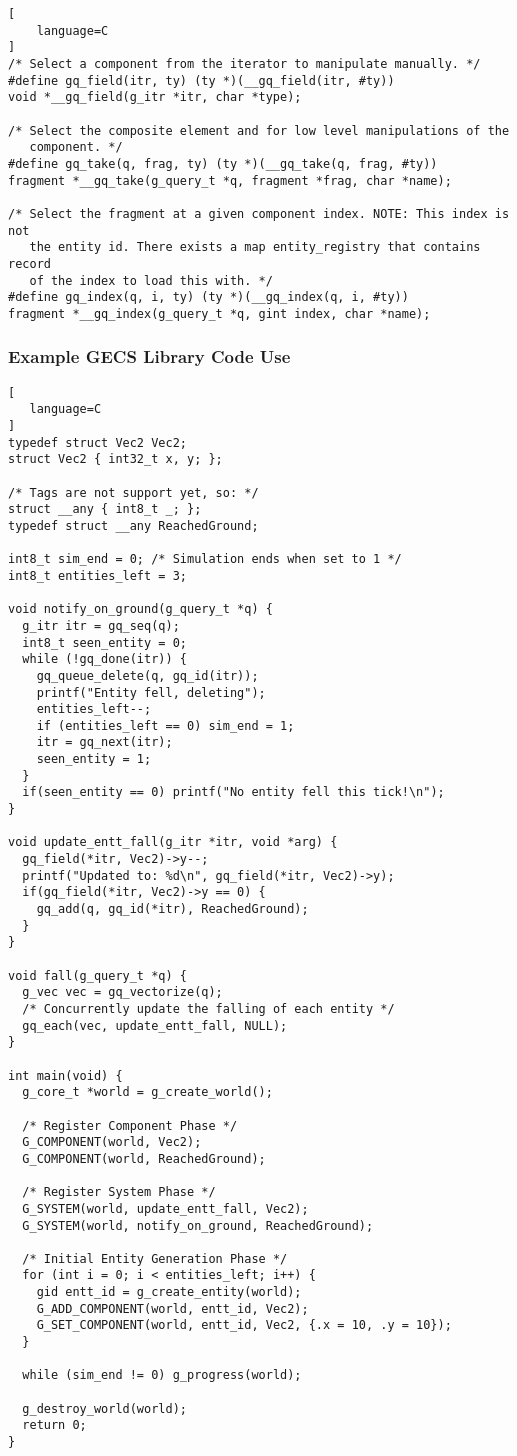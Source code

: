 \begin{lstlisting}[
    language=C
]
/* Select a component from the iterator to manipulate manually. */
#define gq_field(itr, ty) (ty *)(__gq_field(itr, #ty))
void *__gq_field(g_itr *itr, char *type);

/* Select the composite element and for low level manipulations of the
   component. */
#define gq_take(q, frag, ty) (ty *)(__gq_take(q, frag, #ty))
fragment *__gq_take(g_query_t *q, fragment *frag, char *name);

/* Select the fragment at a given component index. NOTE: This index is not
   the entity id. There exists a map entity_registry that contains record
   of the index to load this with. */
#define gq_index(q, i, ty) (ty *)(__gq_index(q, i, #ty))
fragment *__gq_index(g_query_t *q, gint index, char *name);
\end{lstlisting}

\subsubsection{Example GECS Library Code Use}
\label{appendix:code_example_1}
\begin{lstlisting}[
   language=C
]
typedef struct Vec2 Vec2;
struct Vec2 { int32_t x, y; };

/* Tags are not support yet, so: */
struct __any { int8_t _; };
typedef struct __any ReachedGround;

int8_t sim_end = 0; /* Simulation ends when set to 1 */
int8_t entities_left = 3;

void notify_on_ground(g_query_t *q) {
  g_itr itr = gq_seq(q);
  int8_t seen_entity = 0;
  while (!gq_done(itr)) {
    gq_queue_delete(q, gq_id(itr));
    printf("Entity fell, deleting");
    entities_left--;
    if (entities_left == 0) sim_end = 1;
    itr = gq_next(itr);
    seen_entity = 1;
  }
  if(seen_entity == 0) printf("No entity fell this tick!\n");
}

void update_entt_fall(g_itr *itr, void *arg) { 
  gq_field(*itr, Vec2)->y--;
  printf("Updated to: %d\n", gq_field(*itr, Vec2)->y);
  if(gq_field(*itr, Vec2)->y == 0) {
    gq_add(q, gq_id(*itr), ReachedGround);
  } 
}

void fall(g_query_t *q) {
  g_vec vec = gq_vectorize(q);
  /* Concurrently update the falling of each entity */
  gq_each(vec, update_entt_fall, NULL);
}

int main(void) {
  g_core_t *world = g_create_world();

  /* Register Component Phase */
  G_COMPONENT(world, Vec2);
  G_COMPONENT(world, ReachedGround);

  /* Register System Phase */
  G_SYSTEM(world, update_entt_fall, Vec2);
  G_SYSTEM(world, notify_on_ground, ReachedGround);

  /* Initial Entity Generation Phase */
  for (int i = 0; i < entities_left; i++) {
    gid entt_id = g_create_entity(world);
    G_ADD_COMPONENT(world, entt_id, Vec2);
    G_SET_COMPONENT(world, entt_id, Vec2, {.x = 10, .y = 10});
  }

  while (sim_end != 0) g_progress(world);

  g_destroy_world(world);
  return 0;
}
\end{lstlisting}